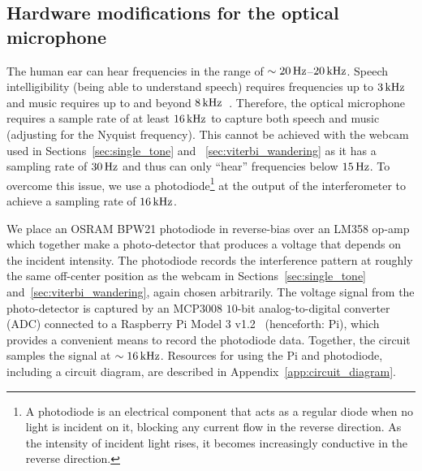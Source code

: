 \documentclass[paper-main.tex]{subfiles}
\begin{document}
\subsection{Hardware modifications for the optical microphone}
\label{sec:photodiode}
The human ear can hear frequencies in the range of $\sim 20\,{\rm Hz}$--$20\,{\rm kHz}$. 
Speech intelligibility (being able to understand speech) requires frequencies up to $3\,{\rm kHz}$ and music requires up to and beyond $8\,{\rm kHz}$~\cite{speech_intelligibility}. Therefore, the optical microphone requires a sample rate of at least $16\,{\rm kHz}$ to capture both speech and music (adjusting for the Nyquist frequency). 
This cannot be achieved with the webcam used in Sections~\ref{sec:single_tone} and ~\ref{sec:viterbi_wandering} as it has a sampling rate of $30\,{\rm Hz}$ and thus can only ``hear'' frequencies below $15\,{\rm Hz}$.
To overcome this issue, we use a photodiode\footnote{A photodiode is an electrical component that acts as a regular diode when no light is incident on it, blocking any current flow in the reverse direction. As the intensity of incident light rises, it becomes increasingly conductive in the reverse direction.} at the output of the interferometer to achieve a sampling rate of $16\,{\rm kHz}$.

We place an OSRAM BPW21 photodiode in reverse-bias over an LM358 op-amp which together make a photo-detector that produces a voltage that depends on the incident intensity. 
The photodiode records the interference pattern at roughly the same off-center position as the webcam in Sections~\ref{sec:single_tone} and~\ref{sec:viterbi_wandering}, again chosen arbitrarily.
The voltage signal from the photo-detector is captured by an MCP3008 $10$-bit analog-to-digital converter (ADC) connected to a Raspberry Pi Model 3 v1.2~\cite{RaspberryPi:online} (henceforth: Pi), which provides a convenient means to record the photodiode data.
Together, the circuit samples the signal at $\sim 16\,{\rm kHz}$. 
Resources for using the Pi and photodiode, including a circuit diagram, are described in Appendix~\ref{app:circuit_diagram}.
\end{document}
